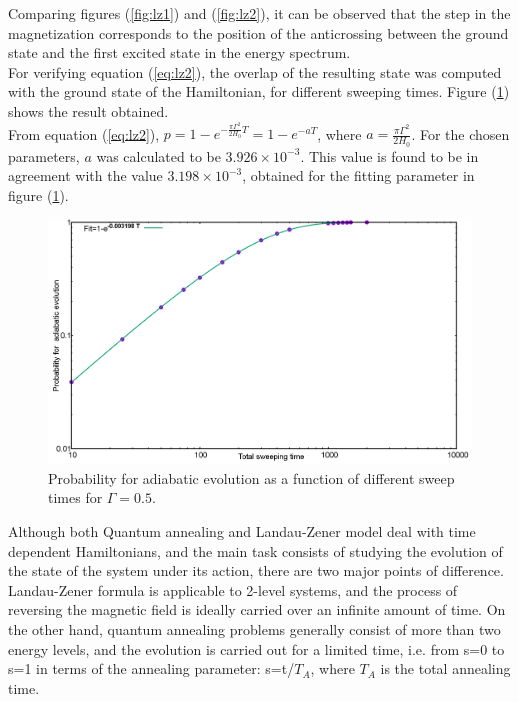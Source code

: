 \documentclass[../main.tex]{subfiles}
\begin{document}
Comparing figures (\ref{fig:lz1}) and (\ref{fig:lz2}), it can be observed that the step in the magnetization corresponds to the position of the anticrossing between the ground state and the first excited state in the energy spectrum.\\

For verifying equation (\ref{eq:lz2}), the overlap of the resulting state was computed with the ground state of the Hamiltonian, for different sweeping times. Figure (\ref{fig:lz3}) shows the result obtained.\\

From equation (\ref{eq:lz2}), $p=1-e^{-\frac{\pi \Gamma^2}{2H_0} T}=1-e^{-aT}$, where $a=\frac{\pi \Gamma^2}{2H_0}$. For the chosen parameters, $a$ was calculated to be $3.926 \times 10^{-3}$. This value is found to be in agreement with the value $3.198 \times 10^{-3}$, obtained for the fitting parameter in figure (\ref{fig:lz3}).

\begin{figure}[H]
\centering 
\includegraphics[scale=0.3]{Prob_1spin_H100.png}
\caption{Probability for adiabatic evolution as a function of different sweep times for $\Gamma=0.5$.}
\label{fig:lz3}
\end{figure}



Although both Quantum annealing and Landau-Zener model deal with time dependent Hamiltonians, and the main task consists of studying the evolution of the state of the system under its action, there are two major points of difference. Landau-Zener formula is applicable to 2-level systems, and the process of reversing the magnetic field is ideally carried over an infinite amount of time. On the other hand, quantum annealing problems generally consist of more than two energy levels, and the evolution is carried out for a limited time, i.e. from s=0 to s=1 in terms of the annealing parameter: s=t/$T_A$, where $T_A$ is the total annealing time.
\end{document}
